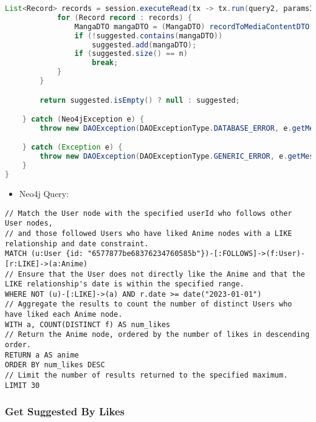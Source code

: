 \begin{mdframed}[style=customstyle]
\begin{lstlisting}[language=java]
            List<Record> records = session.executeRead(tx -> tx.run(query2, params3).list());
            for (Record record : records) {
                MangaDTO mangaDTO = (MangaDTO) recordToMediaContentDTO(record);
                if (!suggested.contains(mangaDTO))
                    suggested.add(mangaDTO);
                if (suggested.size() == n)
                    break;
            }
        }

        return suggested.isEmpty() ? null : suggested;

    } catch (Neo4jException e) {
        throw new DAOException(DAOExceptionType.DATABASE_ERROR, e.getMessage());

    } catch (Exception e) {
        throw new DAOException(DAOExceptionType.GENERIC_ERROR, e.getMessage());
    }
}\end{lstlisting}
\end{mdframed}

\newpage

\begin{itemize}
    \item Neo4j Query:
\end{itemize}

\begin{mdframed}[style=customstyle2]
\begin{lstlisting}[language=Cypher, backgroundcolor=\color{white}]
// Match the User node with the specified userId who follows other User nodes,
// and those followed Users who have liked Anime nodes with a LIKE relationship and date constraint.
MATCH (u:User {id: "6577877be68376234760585b"})-[:FOLLOWS]->(f:User)-[r:LIKE]->(a:Anime)
// Ensure that the User does not directly like the Anime and that the LIKE relationship's date is within the specified range.
WHERE NOT (u)-[:LIKE]->(a) AND r.date >= date("2023-01-01")
// Aggregate the results to count the number of distinct Users who have liked each Anime node.
WITH a, COUNT(DISTINCT f) AS num_likes
// Return the Anime node, ordered by the number of likes in descending order.
RETURN a AS anime
ORDER BY num_likes DESC
// Limit the number of results returned to the specified maximum.
LIMIT 30\end{lstlisting}
\end{mdframed}

\subsubsection*{Get Suggested By Likes}

